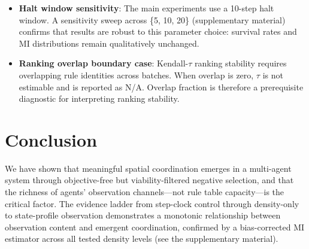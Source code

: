 \documentclass[letterpaper]{article}
\begin{document}
\begin{itemize}
        is evaluated with a single initial configuration in the main experiment.
        The supplementary material provides multi-seed robustness analysis
        for the top 50 rules from each rule-based condition (Phase~2, Phase~1,
        and Control), confirming that MI levels---whether high, low, or
        zero---are stable properties of the rule table, not seed-specific
        accidents.  As a brief in-text summary: among the top 50 Phase~2 rules
        re-evaluated across 20 independent seeds, 84\% maintain positive
        median $\Delta\mathrm{MI}$ (mean $P(\Delta\mathrm{MI}>0)=0.748$),
        compared to 36\% for Phase~1 and 44\% for Control. Supplementary~\S{}R extends the multi-seed analysis to 200 randomly selected survivors per condition (not only the top-50), with bootstrap confidence intervals confirming that the whole $\Delta\mathrm{MI}$ distribution is stable across seeds, not only the top performers.
  \item \textbf{Halt window sensitivity}: The main experiments use a
        10-step halt window. A sensitivity sweep across \{5, 10, 20\}
        (supplementary material) confirms that results are robust to
        this parameter choice: survival rates and MI distributions
        remain qualitatively unchanged.
  \item \textbf{Ranking overlap boundary case}: Kendall-$\tau$ ranking
        stability requires overlapping rule identities across batches.
        When overlap is zero, $\tau$ is not estimable and is reported
        as N/A. Overlap fraction is therefore a prerequisite diagnostic
        for interpreting ranking stability.
\end{itemize}

\section{Conclusion}

We have shown that meaningful spatial coordination emerges in a multi-agent
system through objective-free but viability-filtered negative selection, and that the richness of
agents' observation channels---not rule table capacity---is the critical factor.
The evidence ladder from step-clock control through density-only to
state-profile observation demonstrates a monotonic relationship between
observation content and emergent coordination, confirmed by a
bias-corrected MI estimator across all tested density levels
(see the supplementary material).
\end{document}
